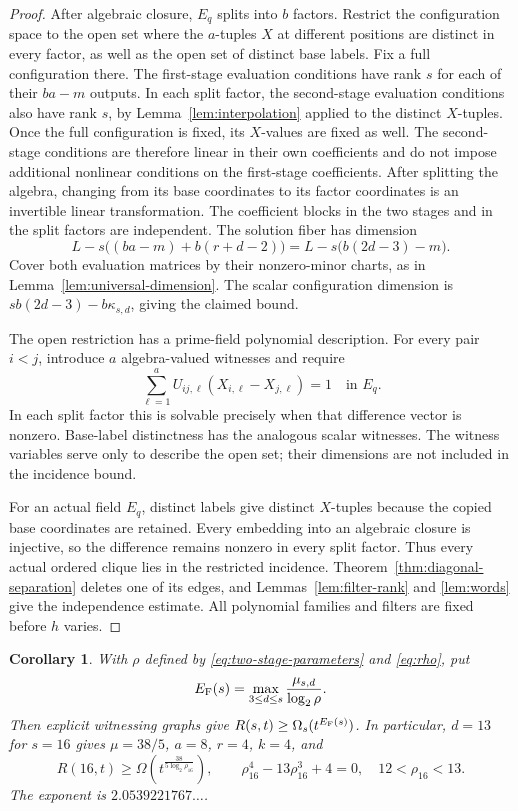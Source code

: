 \documentclass[11pt,a4paper]{article}
\newtheorem{corollary}[theorem]{Corollary}
\theoremstyle{definition}
\theoremstyle{remark}
\numberwithin{equation}{section}
\begin{document}
\begin{proof}
After algebraic closure, $E_q$ splits into $b$ factors. Restrict the configuration space to the open set where the $a$-tuples $X$ at different positions are distinct in every factor, as well as the open set of distinct base labels. Fix a full configuration there. The first-stage evaluation conditions have rank $s$ for each of their $ba-m$ outputs. In each split factor, the second-stage evaluation conditions also have rank $s$, by Lemma~\ref{lem:interpolation} applied to the distinct $X$-tuples. Once the full configuration is fixed, its $X$-values are fixed as well. The second-stage conditions are therefore linear in their own coefficients and do not impose additional nonlinear conditions on the first-stage coefficients. After splitting the algebra, changing from its base coordinates to its factor coordinates is an invertible linear transformation. The coefficient blocks in the two stages and in the split factors are independent. The solution fiber has dimension
\[
L-s\bigl((ba-m)+b(r+d-2)\bigr)=L-s\bigl(b(2d-3)-m\bigr).
\]
Cover both evaluation matrices by their nonzero-minor charts, as in Lemma~\ref{lem:universal-dimension}. The scalar configuration dimension is $s b(2d-3)-b\kappa_{s,d}$, giving the claimed bound.

The open restriction has a prime-field polynomial description. For every pair $i<j$, introduce $a$ algebra-valued witnesses and require
\[
\sum_{\ell=1}^a U_{ij,\ell}(X_{i,\ell}-X_{j,\ell})=1\quad\text{in }E_q.
\]
In each split factor this is solvable precisely when that difference vector is nonzero. Base-label distinctness has the analogous scalar witnesses. The witness variables serve only to describe the open set; their dimensions are not included in the incidence bound.

For an actual field $E_q$, distinct labels give distinct $X$-tuples because the copied base coordinates are retained. Every embedding into an algebraic closure is injective, so the difference remains nonzero in every split factor. Thus every actual ordered clique lies in the restricted incidence. Theorem~\ref{thm:diagonal-separation} deletes one of its edges, and Lemmas~\ref{lem:filter-rank} and \ref{lem:words} give the independence estimate. All polynomial families and filters are fixed before $h$ varies.
\end{proof}

\begin{corollary}\label{cor:frobenius-exponent}
With $\rho$ defined by \eqref{eq:two-stage-parameters} and \eqref{eq:rho}, put
\begin{equation}\label{eq:EF}
E_{\rm F}(s)=\max_{3\le d\le s}\frac{\mu_{s,d}}{\log_2\rho}.
\end{equation}
Then explicit witnessing graphs give $R(s,t)\ge\Omega_s(t^{E_{\rm F}(s)})$. In particular, $d=13$ for $s=16$ gives $\mu=38/5$, $a=8$, $r=4$, $k=4$, and
\begin{equation}\label{eq:R16}
R(16,t)\ge\Omega\left(t^{\frac{38}{5\log_2\rho_{16}}}\right),\qquad
\rho_{16}^4-13\rho_{16}^3+4=0,\quad 12<\rho_{16}<13.
\end{equation}
The exponent is $2.0539221767\ldots$.
\end{corollary}
\end{document}
